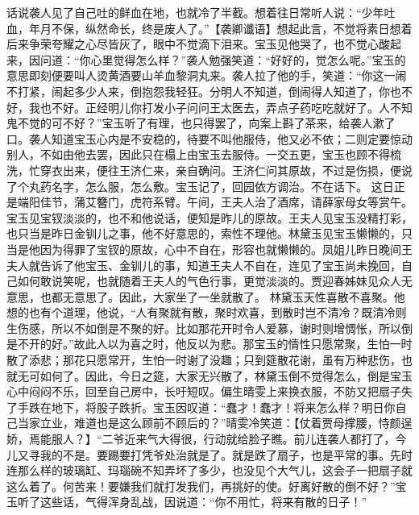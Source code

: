 \documentclass[12pt,oneside]{book}
\begin{document}
话说袭人见了自己吐的鲜血在地，也就冷了半截。想着往日常听人说：“少年吐血，年月不保，纵然命长，终是废人了。”【袭卿谶语】想起此言，不觉将素日想着后来争荣夸耀之心尽皆灰了，眼中不觉滴下泪来。宝玉见他哭了，也不觉心酸起来，因问道：“你心里觉得怎么样？”袭人勉强笑道：“好好的，觉怎么呢。”宝玉的意思即刻便要叫人烫黄酒要山羊血黎洞丸来。袭人拉了他的手，笑道：“你这一闹不打紧，闹起多少人来，倒抱怨我轻狂。分明人不知道，倒闹得人知道了，你也不好，我也不好。正经明儿你打发小子问问王太医去，弄点子药吃吃就好了。人不知鬼不觉的可不好？”宝玉听了有理，也只得罢了，向案上斟了茶来，给袭人漱了口。袭人知道宝玉心内是不安稳的，待要不叫他服侍，他又必不依；二则定要惊动别人，不如由他去罢，因此只在榻上由宝玉去服侍。一交五更，宝玉也顾不得梳洗，忙穿衣出来，便往王济仁来，亲自确问。王济仁问其原故，不过是伤损，便说了个丸药名字，怎么服，怎么敷。宝玉记了，回园依方调治。不在话下。
这日正是端阳佳节，蒲艾簪门，虎符系臂。午间，王夫人治了酒席，请薛家母女等赏午。宝玉见宝钗淡淡的，也不和他说话，便知是昨儿的原故。王夫人见宝玉没精打彩，也只当是昨日金钏儿之事，他不好意思的，索性不理他。林黛玉见宝玉懒懒的，只当是他因为得罪了宝钗的原故，心中不自在，形容也就懒懒的。凤姐儿昨日晚间王夫人就告诉了他宝玉、金钏儿的事，知道王夫人不自在，连见了宝玉尚未挽回，自己如何敢说笑呢，也就随着王夫人的气色行事，更觉淡淡的。贾迎春姊妹见众人无意思，也都无意思了。因此，大家坐了一坐就散了。
林黛玉天性喜散不喜聚。他想的也有个道理，他说，“人有聚就有散，聚时欢喜，到散时岂不清冷？既清冷则生伤感，所以不如倒是不聚的好。比如那花开时令人爱慕，谢时则增惆怅，所以倒是不开的好。”故此人以为喜之时，他反以为悲。那宝玉的情性只愿常聚，生怕一时散了添悲；那花只愿常开，生怕一时谢了没趣；只到筵散花谢，虽有万种悲伤，也就无可如何了。因此，今日之筵，大家无兴散了，林黛玉倒不觉得怎么，倒是宝玉心中闷闷不乐，回至自己房中，长吁短叹。偏生晴雯上来换衣服，不防又把扇子失了手跌在地下，将股子跌折。宝玉因叹道：“蠢才！蠢才！将来怎么样？明日你自己当家立业，难道也是这么顾前不顾后的？”晴雯冷笑道：【仗着贾母撑腰，恃颜逞娇，焉能服人？】“二爷近来气大得很，行动就给脸子瞧。前儿连袭人都打了，今儿又寻我的不是。要踢要打凭爷处治就是了。就是跌了扇子，也是平常的事。先时连那么样的玻璃缸、玛瑙碗不知弄坏了多少，也没见个大气儿，这会子一把扇子就这么着了。何苦来！要嫌我们就打发我们，再挑好的使。好离好散的倒不好？”宝玉听了这些话，气得浑身乱战，因说道：“你不用忙，将来有散的日子！”
\end{document}
